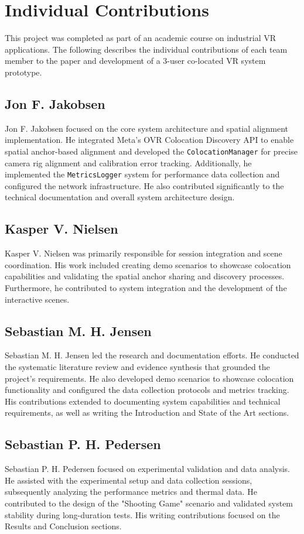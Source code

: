 \section*{Individual Contributions}

This project was completed as part of an academic course on industrial VR applications. The following describes the individual contributions of each team member to the paper and development of a 3-user co-located VR system prototype.

\subsection*{Jon F. Jakobsen}
Jon F. Jakobsen focused on the core system architecture and spatial alignment implementation. He integrated Meta's OVR Colocation Discovery API to enable spatial anchor-based alignment and developed the \texttt{ColocationManager} for precise camera rig alignment and calibration error tracking. Additionally, he implemented the \texttt{MetricsLogger} system for performance data collection and configured the network infrastructure. He also contributed significantly to the technical documentation and overall system architecture design.

\subsection*{Kasper V. Nielsen}
Kasper V. Nielsen was primarily responsible for session integration and scene coordination. His work included creating demo scenarios to showcase colocation capabilities and validating the spatial anchor sharing and discovery processes. Furthermore, he contributed to system integration and the development of the interactive scenes.

\subsection*{Sebastian M. H. Jensen}
Sebastian M. H. Jensen led the research and documentation efforts. He conducted the systematic literature review and evidence synthesis that grounded the project's requirements. He also developed demo scenarios to showcase colocation functionality and configured the data collection protocols and metrics tracking. His contributions extended to documenting system capabilities and technical requirements, as well as writing the Introduction and State of the Art sections.

\subsection*{Sebastian P. H. Pedersen}
Sebastian P. H. Pedersen focused on experimental validation and data analysis. He assisted with the experimental setup and data collection sessions, subsequently analyzing the performance metrics and thermal data. He contributed to the design of the "Shooting Game" scenario and validated system stability during long-duration tests. His writing contributions focused on the Results and Conclusion sections.

